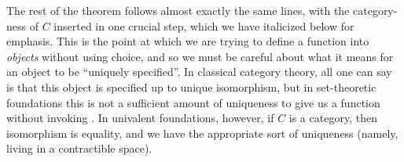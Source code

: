 The rest of the theorem follows almost exactly the same lines, with the category-ness of $C$ inserted in one crucial step, which we have italicized below for emphasis.
This is the point at which we are trying to define a function into \emph{objects} without using choice, and so we must be careful about what it means for an object to be ``uniquely specified''.
In classical category theory, all one can say is that this object is specified up to unique isomorphism, but in set-theoretic foundations this is not a sufficient amount of uniqueness to give us a function without invoking \choice{}.
In univalent foundations, however, if $C$ is a category, then isomorphism is equality, and we have the appropriate sort of uniqueness (namely, living in a contractible space).

%

